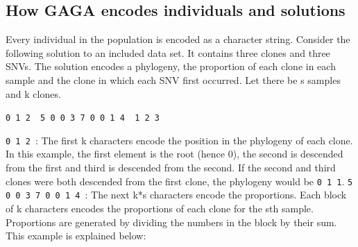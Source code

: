 \documentclass[a4paper]{article}\usepackage[]{graphicx}\usepackage[]{color}
\begin{document}
\subsection{How GAGA encodes individuals and solutions}
Every individual in the population is encoded as a character string.  Consider the following solution to an included data set.  It contains three clones and three SNVs.  The solution encodes a phylogeny, the proportion of each clone in each sample and the clone in which each SNV first occurred.  Let there be {\color{icrpink}s} samples and {\color{icrred}k} clones.
\newline
\newline
{\raggedright{}\texttt{{\color{icrgreen}0  1  2 }{\color{icryellow} 5  0  0  3  7  0   0   1   4 }{\color{icrorange} 1   2   3 }}}
\newline
\newline
\texttt{{\color{icrgreen}0  1  2 }}: The first {\color{icrred}k} characters encode the position in the phylogeny of each clone.  In this example, the first element is the root (hence 0), the second is descended from the first and third is descended from the second.  If the second and third clones were both descended from the first clone, the phylogeny would be \texttt{0 1 1}.
\newline
\newline
\texttt{{\color{icryellow}5  0  0  3  7  0   0   1   4 }}: The next {\color{icrred}k}*{\color{icrpink}s} characters encode the proportions.  Each block of {\color{icrred}k} characters encodes the proportions of each clone for the {\color{icrpink}s}th sample.  Proportions are generated by dividing the numbers in the block by their sum.  This example is explained below:
\end{document}
